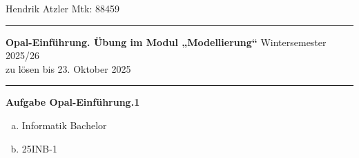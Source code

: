 \documentclass[a4paper,12pt]{article}
\begin{document}
Hendrik Atzler \hfill Mtk: 88459

\rule{\textwidth}{0.4pt}


{\textbf{Opal-Einführung. Übung im Modul „Modellierung“ }\hfill Wintersemester 2025/26} \\
zu lösen bis 23. Oktober 2025 \\
\rule{\textwidth}{0.4pt}

{\large{\textbf{Aufgabe Opal-Einführung.1}}} \\
\begin{enumerate}[a.]
  \item Informatik Bachelor
  \item 25INB-1
\end{enumerate}
\end{document}
